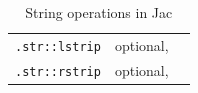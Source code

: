 {\begin{table}[t]
\begin{tabular}{l p{3cm} p{6cm}}
            \lstinline{.str::lstrip}                              & optional,                                                                                                                                                      &                                                                                                        \\
            \lstinline{.str::rstrip}                              & optional,                                                                                                                                                      &                                                                                                        \\
            \bottomrule
        \end{tabular}
        \caption{String operations in Jac}
        \label{tab:strops} %
    \end{table}
}

